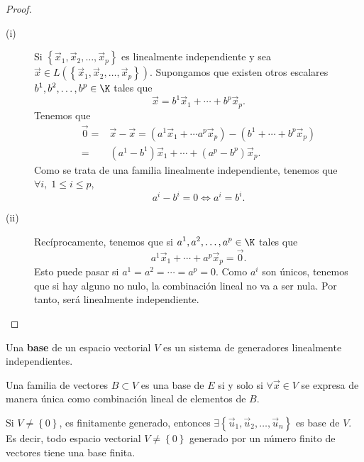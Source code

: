 \begin{proof} 
\begin{description}
\item[(i)] Si $\displaystyle \left\{ \vec{x}_{1}, \vec{x}_{2}, \ldots, \vec{x}_{p}\right\}  $ es linealmente independiente y sea $\displaystyle \vec{x} \in L\left(\left\{ \vec{x}_{1}, \vec{x}_{2}, \ldots, \vec{x}_{p}\right\} \right) $. Supongamos que existen otros escalares $\displaystyle b^{1}, b^{2}, \ldots, b^{p} \in \K $ tales que 
\[\vec{x} = b^{1}\vec{x}_{1} + \cdots + b^{p}\vec{x}_{p} .\]
Tenemos que 
\[
\begin{split}
\vec{0} = & \vec{x} - \vec{x} = \left(a^{1} \vec{x}_{1} + \cdots a^{p} \vec{x}_{p}\right) - \left(b^{1} + \cdots + b^{p}\vec{x}_{p}\right) \\
= & \left(a^{1} - b^{1}\right)\vec{x}_{1} + \cdots + \left(a^{p} -b^{p}\right)\vec{x}_{p} .
\end{split}
\]
Como se trata de una familia linealmente independiente, tenemos que $\displaystyle \forall i, \; 1\leq i \leq p $, 
\[a^{i} - b^{i} = 0 \iff a^{i} = b^{i} .\]
\item[(ii)] Recíprocamente, tenemos que si $\displaystyle a^{1}, a^{2}, \ldots, a^{p} \in \K $ tales que 
	\[a^{1}\vec{x}_{1} + \cdots + a^{p}\vec{x}_{p}= \vec{0} .\]
Esto puede pasar si $\displaystyle a^{1} = a^{2} = \cdots = a^{p} = 0 $. Como $\displaystyle a^{i} $ son únicos, tenemos que si hay alguno no nulo, la combinación lineal no va a ser nula. Por tanto, será linealmente independiente.
\end{description}
\end{proof}

\begin{fdefinition}[Base]
\normalfont Una \textbf{base} de un espacio vectorial $\displaystyle V $ es un sistema de generadores linealmente independientes.
\end{fdefinition}

\begin{fcolorary}[]
\normalfont Una familia de vectores $\displaystyle B \subset V$ es una base de $\displaystyle E $ si y solo si $\displaystyle \forall \vec{x}\in V $ se expresa de manera única como combinación lineal de elementos de $\displaystyle B $.
\end{fcolorary}

\begin{ftheorem}[]
	\normalfont Si $\displaystyle V \neq \left\{ 0\right\}  $, es finitamente generado, entonces $\displaystyle \exists \left\{ \vec{u}_{1}, \vec{u}_{2}, \ldots, \vec{u}_{n}\right\}  $ es base de $\displaystyle V $. Es decir, todo espacio vectorial $\displaystyle V \neq \left\{ 0\right\}  $ generado por un número finito de vectores tiene una base finita. 
\end{ftheorem}

